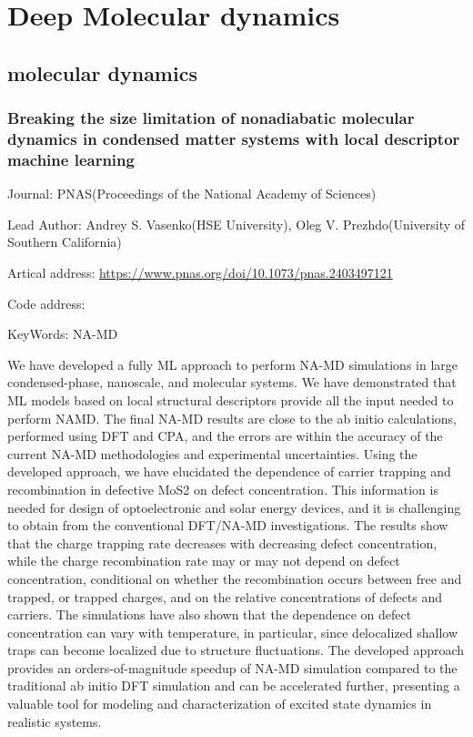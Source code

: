\documentclass[11pt]{elegantbook}
\begin{document}
\chapter{Deep Molecular dynamics}

\section{molecular dynamics}
\subsection{Breaking the size limitation of nonadiabatic molecular dynamics in condensed matter systems with local descriptor machine learning}
\begin{brief}
    \item Journal: PNAS(Proceedings of the National Academy of Sciences)
    \item Lead Author: Andrey S. Vasenko(HSE University), Oleg V. Prezhdo(University of Southern California)
    \item Artical address: \href{https://www.pnas.org/doi/10.1073/pnas.2403497121}{https://www.pnas.org/doi/10.1073/pnas.2403497121}
    \item Code address: 
    \item KeyWords: NA-MD
\end{brief}

We have developed a fully ML approach to perform NA-MD simulations in large condensed-phase, nanoscale, and molecular systems. We have demonstrated that ML models based on local structural descriptors provide all the input needed to perform NAMD. The final NA-MD results are close to the ab initio calculations, performed using DFT and CPA, and the errors are within the accuracy of the current NA-MD methodologies and experimental uncertainties. Using the developed approach, we have elucidated the dependence of carrier trapping and recombination in defective MoS2 on defect concentration. This information is needed for design of optoelectronic and solar energy devices, and it is challenging to obtain from the conventional DFT/NA-MD investigations. The results show that the charge trapping rate decreases with decreasing defect concentration, while the charge recombination rate may or may not depend on defect concentration, conditional on whether the recombination occurs between free and trapped, or trapped charges, and on the relative concentrations of defects and carriers. The simulations have also shown that the dependence on defect concentration can vary with temperature, in particular, since delocalized shallow traps can become localized due to structure fluctuations. The developed approach provides an orders-of-magnitude speedup of NA-MD simulation compared to the traditional ab initio DFT simulation and can be accelerated further, presenting a valuable tool for modeling and characterization of excited state dynamics in realistic systems.
\end{document}
